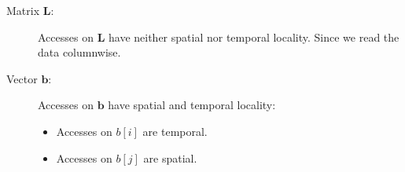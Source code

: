 \documentclass[portrait,a4paper]{article}
\begin{document}
\begin{description}
    \item[Matrix $\mathbf{L}$:] Accesses on $\mathbf{L}$ have neither spatial nor temporal locality. Since we read the data columnwise.
    \item[Vector $\mathbf{b}$:] Accesses on $\mathbf{b}$ have spatial and temporal locality:
        \begin{itemize}
            \item Accesses on $b[i]$ are temporal.
            \item Accesses on $b[j]$ are spatial.
        \end{itemize}
\end{description}
\end{document}
